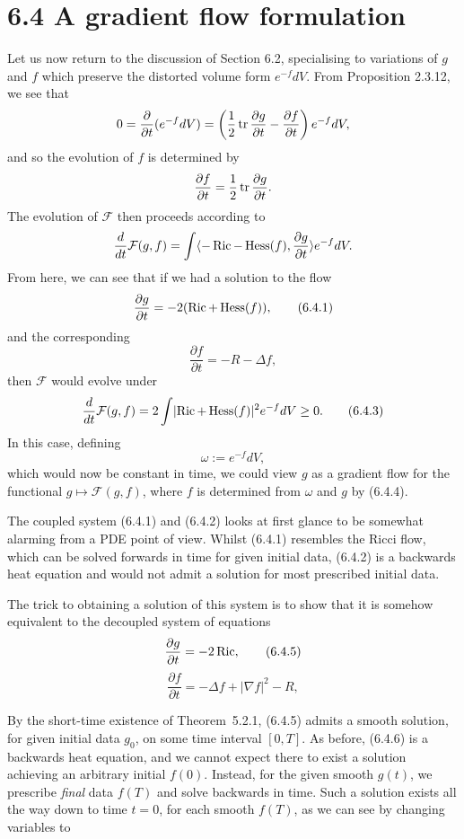 \section{6.4 \quad A gradient flow formulation}

Let us now return to the discussion of Section 6.2, specialising to
variations of $g$ and $f$ which preserve the distorted volume form
$e^{-f} dV$. From Proposition 2.3.12, we see that
\[
  0 = \frac{\partial}{\partial t}(e^{-f} dV)
  = \left(\frac{1}{2}\operatorname{tr} \frac{\partial g}{\partial t}
  - \frac{\partial f}{\partial t}\right)e^{-f} dV,
\]
and so the evolution of $f$ is determined by
\[
  \frac{\partial f}{\partial t}
  = \frac{1}{2}\operatorname{tr} \frac{\partial g}{\partial t}.
\]
The evolution of $\mathcal F$ then proceeds according to
\[
  \frac{d}{dt}\mathcal{F}(g,f)
  = \int \langle -\operatorname{Ric} - \operatorname{Hess}(f), \frac{\partial g}{\partial t}\rangle e^{-f} dV.
\]
From here, we can see that if we had a solution to the flow
\[
  \frac{\partial g}{\partial t} = -2(\operatorname{Ric} + \operatorname{Hess}(f)),
  \tag{6.4.1}
\]
and the corresponding
\[
  \frac{\partial f}{\partial t} = -R - \Delta f,
  \tag{6.4.2}
\]
then $\mathcal{F}$ would evolve under
\[
  \frac{d}{dt}\mathcal{F}(g,f)
  = 2 \int \lvert \operatorname{Ric} + \operatorname{Hess}(f)\rvert^2 e^{-f} dV \geq 0.
  \tag{6.4.3}
\]
In this case, defining
\[
  \omega := e^{-f} dV,
  \tag{6.4.4}
\]
which would now be constant in time, we could view $g$ as a gradient flow for
the functional $g \mapsto \mathcal{F}(g,f)$, where $f$ is determined from
$\omega$ and $g$ by (6.4.4).

The coupled system (6.4.1) and (6.4.2) looks at first glance to be somewhat
alarming from a PDE point of view. Whilst (6.4.1) resembles the Ricci flow,
which can be solved forwards in time for given initial data, (6.4.2) is a
backwards heat equation and would not admit a solution for most prescribed
initial data.

The trick to obtaining a solution of this system is to show that it is somehow
equivalent to the decoupled system of equations
\[
  \frac{\partial g}{\partial t} = -2\operatorname{Ric},
  \tag{6.4.5}
\]
\[
  \frac{\partial f}{\partial t} = -\Delta f + \lvert \nabla f\rvert^2 - R,
  \tag{6.4.6}
\]

By the short-time existence of Theorem~5.2.1, (6.4.5) admits a smooth solution, for given initial data $g_0$, on some time interval $[0,T]$. As before, (6.4.6) is a backwards heat equation, and we cannot expect there to exist a solution achieving an arbitrary initial $f(0)$. Instead, for the given smooth $g(t)$, we prescribe \emph{final} data $f(T)$ and solve backwards in time. Such a solution exists all the way down to time $t=0$, for each smooth $f(T)$, as we can see by changing variables to

